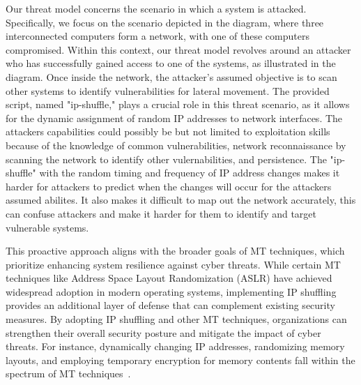 Our threat model concerns the scenario in which a system is attacked. Specifically, we focus on the scenario depicted in the diagram, where 
three interconnected computers form a network, with one of these computers compromised. Within this context, our threat model revolves around 
an attacker who has successfully gained access to one of the systems, as illustrated in the diagram. Once inside the network, the attacker's 
assumed objective is to scan other systems to identify vulnerabilities for lateral movement. The provided script, named "ip-shuffle," plays a crucial 
role in this threat scenario, as it allows for the dynamic assignment of random IP addresses to network interfaces. The attackers capabilities 
could possibly be but not limited to exploitation skills because of the knowledge of common vulnerabilities, network reconnaissance
by scanning the network to identify other vulernabilities, and persistence. The "ip-shuffle" with the random timing and frequency of IP address changes
makes it harder for attackers to predict when the changes will occur for the attackers assumed abilites. It also makes it difficult to map out the 
network accurately, this can confuse attackers and make it harder for them to identify and target vulnerable systems.

This proactive approach aligns with the broader goals of MT techniques, which prioritize enhancing system resilience against cyber 
threats. While certain MT techniques like Address Space Layout Randomization (ASLR) have achieved widespread adoption in modern operating 
systems, implementing IP shuffling provides an additional layer of defense that can complement existing security measures. By adopting IP 
shuffling and other MT techniques, organizations can strengthen their overall security posture and mitigate the impact of cyber threats.
For instance, dynamically changing IP addresses, randomizing memory layouts, and employing temporary encryption for memory contents fall 
within the spectrum of MT techniques~\cite{okhravi2013finding}.